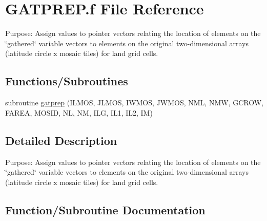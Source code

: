 \hypertarget{GATPREP_8f}{}\section{G\+A\+T\+P\+R\+E\+P.\+f File Reference}
\label{GATPREP_8f}


Purpose\+: Assign values to pointer vectors relating the location of elements on the \char`\"{}gathered\char`\"{} variable vectors to elements on the original two-\/dimensional arrays (latitude circle x mosaic tiles) for land grid cells.  


\subsection*{Functions/\+Subroutines}
\begin{DoxyCompactItemize}
\item 
subroutine \hyperlink{GATPREP_8f_a4f34017ff2fe00ba9298f7c75c23492a}{gatprep} (I\+L\+M\+O\+S, J\+L\+M\+O\+S, I\+W\+M\+O\+S, J\+W\+M\+O\+S, N\+M\+L, N\+M\+W, G\+C\+R\+O\+W, F\+A\+R\+E\+A, M\+O\+S\+I\+D, N\+L, N\+M, I\+L\+G, I\+L1, I\+L2, I\+M)
\end{DoxyCompactItemize}


\subsection{Detailed Description}
Purpose\+: Assign values to pointer vectors relating the location of elements on the \char`\"{}gathered\char`\"{} variable vectors to elements on the original two-\/dimensional arrays (latitude circle x mosaic tiles) for land grid cells. 



\subsection{Function/\+Subroutine Documentation}
\hypertarget{GATPREP_8f_a4f34017ff2fe00ba9298f7c75c23492a}{}
